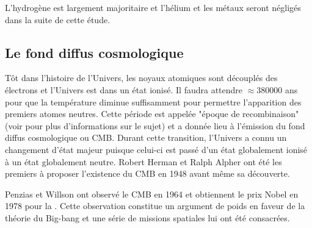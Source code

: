 L'hydrogène est largement majoritaire et l'hélium et les métaux seront négligés dans la suite de cette étude.

\subsection{Le fond diffus cosmologique}
\label{sec:CMB}

Tôt dans l'histoire de l'Univers, les noyaux atomiques sont découplés des électrons et l'Univers est dans un état ionisé. %
Il faudra attendre $\approx 380 000$ ans pour que la température diminue suffisamment pour permettre l'apparition des premiers atomes neutres.
Cette période est appelée "époque de recombinaison" (voir \cite{2009AN....330..657S} pour plus d'informations sur le sujet) et a donnée lieu à l'émission du fond diffus cosmologique ou \ac{CMB}.
Durant cette transition, l'Univers a connu un changement d'état majeur puisque celui-ci est passé d'un état globalement ionisé à un état globalement neutre.
Robert Herman et Ralph Alpher ont été les premiers à proposer l’existence du \ac{CMB} en 1948 avant même sa découverte.
%
%

Penzias et Willson ont observé le \ac{CMB} en 1964 et obtiennent le prix Nobel en 1978 pour la \cite{PenziasWilsonNobel}.
Cette observation constitue un argument de poids en faveur de la théorie du Big-bang et une série de missions spatiales lui ont été consacrées.


